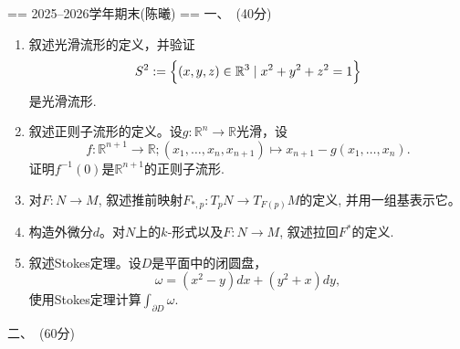 
== 2025--2026学年期末(陈曦) ==
一、\ (40分)
\begin{enumerate}
    \item 叙述光滑流形的定义，并验证
    $$S^2:=\Bigl\{(x,y,z)\in\mathbb{R}^3\mid x^2+y^2+z^2=1\Bigr\}$$
    是光滑流形.
    \item 叙述正则子流形的定义。设$g:\mathbb{R}^n\to\mathbb{R}$光滑，设
    $$f:\mathbb{R}^{n+1}\to\mathbb{R};(x_1,\ldots,x_n,x_{n+1})\mapsto x_{n+1}-g(x_1,\ldots,x_n).$$
    证明$f^{-1}(0)$是$\mathbb{R}^{n+1}$的正则子流形.
    \item 对$F:N\to M$, 叙述推前映射$F_{*,p}:T_pN\to T_{F(p)}M$的定义, 并用一组基表示它。
    \item 构造外微分$d$。对$N$上的$k$-形式以及$F:N\to M$, 叙述拉回$F^*$的定义.
    \item 叙述Stokes定理。设$D$是平面中的闭圆盘，
    $$\omega=(x^2-y)dx+(y^2+x)dy,$$
    使用Stokes定理计算$\int_{\partial D}\omega.$
\end{enumerate}
二、\ (60分)
